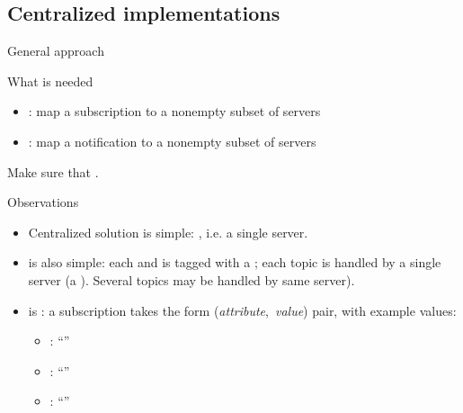\subsection{Centralized implementations}
\begin{frame}{General approach}
  \begin{block}{What is needed}
    \begin{itemize}\firmlist
      \item {}: map a subscription  to a nonempty subset  of servers
      \item {}: map a notification  to a nonempty subset  of servers
    \end{itemize}
    Make sure that .
  \end{block}
  \begin{alertblock}{Observations}
    \begin{itemize}
      \item Centralized solution is simple: , i.e. a single server.
      \item {} is also simple: each  and  is tagged with a
            ; each topic is handled by a single server (a ). Several
            topics may be handled by same server).
      \item {} is : a subscription takes the form
            (\emph{attribute},~\emph{value}) pair, with example values:
            \begin{itemize}\tightlist
              \item {}: ``''
              \item {}: ``''
              \item {}: ``''
            \end{itemize}
    \end{itemize}
  \end{alertblock}
\end{frame}
